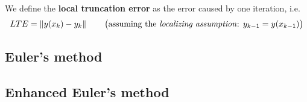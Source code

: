 \begin{definition}
  We define the \textbf{local truncation error} as the error caused by one iteration, i.e. $$LTE = \left\lVert y(x_k) - y_k\right\rVert \qquad \text{\big(assuming the \textit{localizing assumption}: $y_{k-1} = y(x_{k-1})$\big)}$$
\end{definition}

\subsection{Euler's method}

\newpage

\subsection{Enhanced Euler's method}